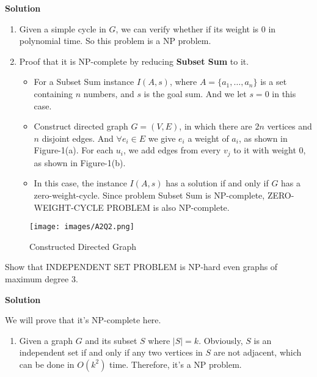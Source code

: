 \documentclass{article}
\newcounter{exercise}
\newcommand{\<}{
    \langle}
\renewcommand{\>}{
    \rangle}
\begin{document}
{\bigskip 
\noindent \textbf{Solution}

\begin{enumerate}[label=\arabic*)]
    \item Given a simple cycle in $G$, we can verify whether if its weight is $0$ in polynomial time. So this problem is a NP problem.
    \item Proof that it is NP-complete by reducing \textbf{Subset Sum} to it. 
    \begin{itemize}
        \item For a Subset Sum instance $I(A, s)$, where $A=\{a_1, \dots, a_n\}$ is a set containing $n$ numbers, and $s$ is the goal sum. And we let $s =  0$ in this case.
        \item Construct directed graph $G=(V,E)$, in which there are $2n$ vertices and $n$ disjoint edges. And  $\forall{e_i \in E}$ we give $e_i$ a weight of $a_i$, as shown in Figure-1(a). For each $u_i$, we add edges from every $v_j$ to it with weight $0$, as shown in Figure-1(b).
        \item In this case, the instance $I(A,s)$ has a solution if and only if $G$ has a zero-weight-cycle. Since problem Subset Sum is NP-complete, \textsf{ZERO-WEIGHT-CYCLE PROBLEM} is also NP-complete.
    \end{itemize}
\end{enumerate}
\newpage
\begin{figure}[htp]
    \centering
    \texttt{[image: images/A2Q2.png]}
    \caption{Constructed Directed Graph}
\end{figure}


\begin{exercise}
Show that \textsf{INDEPENDENT SET PROBLEM} is NP-hard even graphs of maximum degree $3$.
\end{exercise}

\bigskip \noindent 
\textbf{Solution} 
\bigskip

We will prove that it's NP-complete here.

\begin{enumerate}[label=\arabic*)]
    \item Given a graph $G$ and its subset $S$ where $|S| = k$. Obviously, $S$ is an independent set if and only if any two vertices in $S$ are not adjacent, which can be done in $O(k^2)$ time. Therefore, it's a NP problem.
    

\end{enumerate}}
\end{document}
